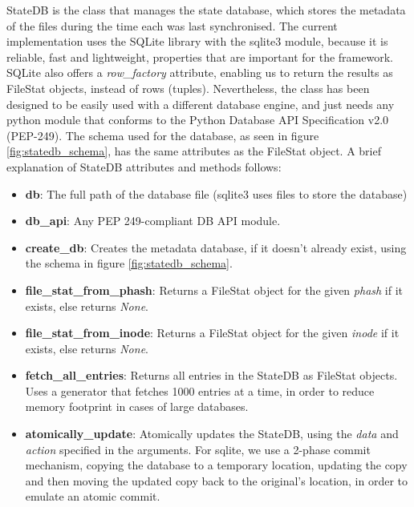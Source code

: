    StateDB is the class that manages the state database, which stores the metadata of the files during the time each was last synchronised. The current implementation uses the SQLite library with the sqlite3 module, because it is reliable, fast and lightweight, properties that are important for the framework. SQLite also offers a \emph{row\_factory} attribute, enabling us to return the results as FileStat objects, instead of rows (tuples). Nevertheless, the class has been designed to be easily used with a different database engine, and just needs any python module that conforms to the Python Database API Specification v2.0 (PEP-249)\cite{pep-249}. The schema used for the database, as seen in figure \ref{fig:statedb_schema}, has the same attributes as the FileStat object. A brief explanation of StateDB attributes and methods follows:

    \begin{itemize}
      \item \textbf{db}: The full path of the database file (sqlite3 uses files to store the database)
      \item \textbf{db\_api}: Any PEP 249-compliant DB API module.\\
      \item \textbf{create\_db}: Creates the metadata database, if it doesn't already exist, using the schema in figure \ref{fig:statedb_schema}.
      \item \textbf{file\_stat\_from\_phash}: Returns a FileStat object for the given \emph{phash} if it exists, else returns \emph{None}.
      \item \textbf{file\_stat\_from\_inode}: Returns a FileStat object for the given \emph{inode} if it exists, else returns \emph{None}.
      \item \textbf{fetch\_all\_entries}: Returns all entries in the StateDB as FileStat objects. Uses a generator that fetches 1000 entries at a time, in order to reduce memory footprint in cases of large databases.
      \item \textbf{atomically\_update}: Atomically updates the StateDB, using the \emph{data} and \emph{action} specified in the arguments. For sqlite, we use a 2-phase commit mechanism, copying the database to a temporary location, updating the copy and then moving the updated copy back to the original's location, in order to emulate an atomic commit.
    \end{itemize}

